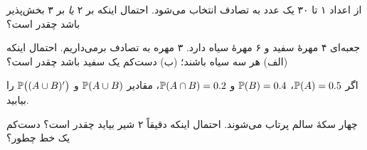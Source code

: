 \begin{exercise}
از اعداد ۱ تا ۳۰ یک عدد به تصادف انتخاب می‌شود. احتمال اینکه بر ۲ \emph{یا} بر ۳ بخش‌پذیر باشد چقدر است؟
\end{exercise}

\begin{exercise}
جعبه‌ای ۴ مهرهٔ سفید و ۶ مهرهٔ سیاه دارد. ۳ مهره به تصادف برمی‌داریم. احتمال اینکه (الف) هر سه سیاه باشند؛ (ب) دست‌کم یک سفید باشد چقدر است؟
\end{exercise}

\begin{exercise}
اگر $\P(A)=0.5$، $\P(B)=0.4$ و $\P(A\cap B)=0.2$، مقادیر $\P(A\cup B)$ و $\P\bigl((A\cup B)'\bigr)$ را بیابید.
\end{exercise}

\begin{exercise}
چهار سکهٔ سالم پرتاب می‌شوند. احتمال اینکه دقیقاً ۲ شیر بیاید چقدر است؟ دست‌کم یک خط چطور؟
\end{exercise}

